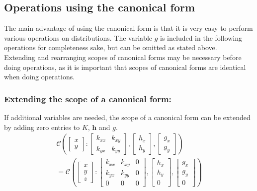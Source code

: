 \documentclass[12pt,oneside,openany,a4paper, %
afrikaans,english,
]{memoir}
\numberwithin{equation}{chapter}
\begin{document}
\subsection{Operations using the canonical form}
The main advantage of using the canonical form is that it is very easy to perform various operations on distributions. The variable $g$ is included in the following operations for completeness sake, but can be omitted as stated above.\\
Extending and rearranging scopes of canonical forms may be necessary before doing operations, as it is important that scopes of canonical forms are identical when doing operations.
\subsubsection{Extending the scope of a canonical form:}
If additional variables are needed, the scope of a canonical form can be extended by adding zero entries to $K$, $\bm{h}$ and $g$. 
\begin{multline}
\mathcal{C}\left(
\begin{bmatrix}
x\\
y
\end{bmatrix}:
\begin{bmatrix}
k_{xx} & k_{xy}\\
k_{yx} & k_{yy}
\end{bmatrix},
\begin{bmatrix}
h_x\\
h_y
\end{bmatrix},
\begin{bmatrix}
g_x\\
g_y
\end{bmatrix}
\right)
\\=
\mathcal{C}\left(
\begin{bmatrix}
x\\
y\\
z
\end{bmatrix}:
\begin{bmatrix}
k_{xx} & k_{xy} & 0\\
k_{yx} & k_{yy} & 0\\
0 & 0 & 0
\end{bmatrix},
\begin{bmatrix}
h_x\\
h_y\\
0
\end{bmatrix},
\begin{bmatrix}
g_x\\
g_y\\
0
\end{bmatrix}
\right)
\end{multline}
\end{document}
